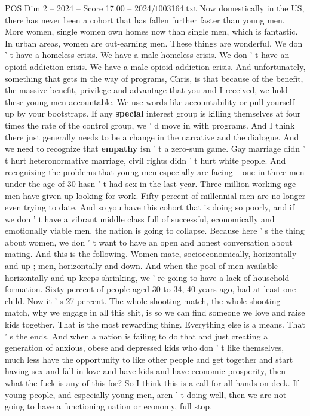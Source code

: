 \begin{textsample}{POS Dim 2 – 2024 – Score 17.00 – 2024/t003164.txt}
Now domestically in the US, there has never been a cohort that has fallen further faster than young men.
More women, single women own homes now than single men, which is fantastic.
In urban areas, women are out-earning men.
These things are wonderful.
We don ' t have a homeless crisis.
We have a male homeless crisis.
We don ' t have an opioid addiction crisis.
We have a male opioid addiction crisis.
And unfortunately, something that gets in the way of programs, Chris, is that because of the benefit, the massive benefit, privilege and advantage that you and I received, we hold these young men accountable.
We use words like accountability or pull yourself up by your bootstraps.
If any \textbf{special} interest group is killing themselves at four times the rate of the control group, we ' d move in with programs.
And I think there just generally needs to be a change in the narrative and the dialogue.
And we need to recognize that \textbf{empathy} isn ' t a zero-sum game.
Gay marriage didn ' t hurt heteronormative marriage, civil rights didn ' t hurt white people.
And recognizing the problems that young men especially are facing -- one in three men under the age of 30 hasn ' t had sex in the last year.
Three million working-age men have given up looking for work.
Fifty percent of millennial men are no longer even trying to date.
And so you have this cohort that is doing so poorly, and if we don ' t have a vibrant middle class full of successful, economically and emotionally viable men, the nation is going to collapse.
Because here ' s the thing about women, we don ' t want to have an open and honest conversation about mating.
And this is the following.
Women mate, socioeconomically, horizontally and up ; men, horizontally and down.
And when the pool of men available horizontally and up keeps shrinking, we ' re going to have a lack of household formation.
Sixty percent of people aged 30 to 34, 40 years ago, had at least one child.
Now it ' s 27 percent.
The whole shooting match, the whole shooting match, why we engage in all this shit, is so we can find someone we love and raise kids together.
That is the most rewarding thing.
Everything else is a means.
That ' s the ends.
And when a nation is failing to do that and just creating a generation of anxious, obese and depressed kids who don ' t like themselves, much less have the opportunity to like other people and get together and start having sex and fall in love and have kids and have economic prosperity, then what the fuck is any of this for?
So I think this is a call for all hands on deck.
If young people, and especially young men, aren ' t doing well, then we are not going to have a functioning nation or economy, full stop.

\end{textsample}
